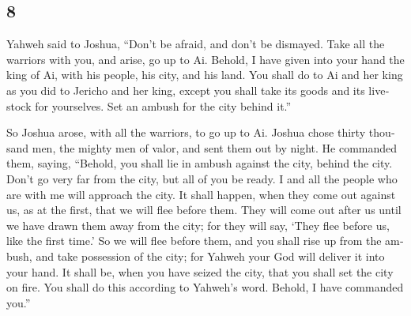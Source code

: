 \begin{paracol}{2}
\switchcolumn
\begin{otherlanguage}{english}

\hypertarget{section-15}{%
\section{8}\label{section-15}}

 Yahweh said to Joshua, ``Don't be afraid, and don't be
dismayed. Take all the warriors with you, and arise, go up to Ai.
Behold, I have given into your hand the king of Ai, with his people, his
city, and his land.  You shall do to Ai and her king as
you did to Jericho and her king, except you shall take its goods and its
livestock for yourselves. Set an ambush for the city behind it.''

 So Joshua arose, with all the warriors, to go up to Ai.
Joshua chose thirty thousand men, the mighty men of valor, and sent them
out by night.  He commanded them, saying, ``Behold, you
shall lie in ambush against the city, behind the city. Don't go very far
from the city, but all of you be ready.  I and all the
people who are with me will approach the city. It shall happen, when
they come out against us, as at the first, that we will flee before
them.  They will come out after us until we have drawn
them away from the city; for they will say, `They flee before us, like
the first time.' So we will flee before them,  and you
shall rise up from the ambush, and take possession of the city; for
Yahweh your God will deliver it into your hand.  It shall
be, when you have seized the city, that you shall set the city on fire.
You shall do this according to Yahweh's word. Behold, I have commanded
you.''


\end{otherlanguage}
\end{paracol}
